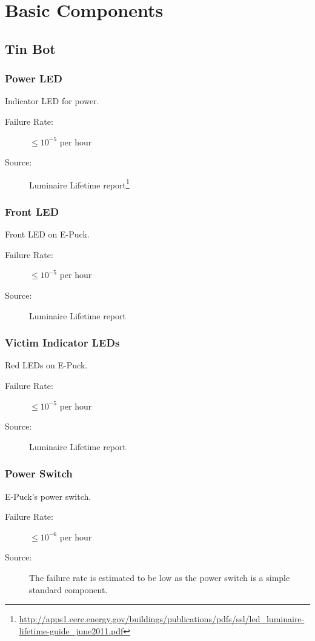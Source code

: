 \documentclass[a4paper,parskip,headheight=38pt]{scrartcl} %
\begin{document}
\section{Basic Components}
\subsection{Tin Bot} %

\subsubsection{Power LED}
Indicator LED for power.
\begin{description}
	\item[Failure Rate:] $\leq 10^{-5}$ per hour
	\item[Source:] Luminaire Lifetime report\footnote{\url{http://apps1.eere.energy.gov/buildings/publications/pdfs/ssl/led\_luminaire-lifetime-guide\_june2011.pdf}}
\end{description}

\subsubsection{Front LED}
Front LED on E-Puck.
\begin{description}
	\item[Failure Rate:] $\leq 10^{-5}$ per hour
	\item[Source:] Luminaire Lifetime report
\end{description}

\subsubsection{Victim Indicator LEDs}
Red LEDs on E-Puck.
\begin{description}
	\item[Failure Rate:] $\leq 10^{-5}$ per hour
	\item[Source:] Luminaire Lifetime report
\end{description}

\subsubsection{Power Switch}
E-Puck's power switch.
\begin{description}
	\item[Failure Rate:] $\leq 10^{-6}$ per hour
	\item[Source:] The failure rate is estimated to be low as the power switch is a simple standard component.
\end{description}
\end{document}
